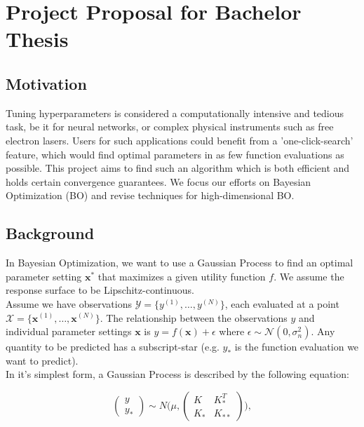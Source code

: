 \section{Project Proposal for Bachelor Thesis}
\subsection{Motivation}

Tuning hyperparameters is considered a computationally intensive and tedious task, be it for neural networks, or complex physical instruments such as free electron lasers.
Users for such applications could benefit from a 'one-click-search' feature, which would find optimal parameters in as few function evaluations as possible.
This project aims to find such an algorithm which is both efficient and holds certain convergence guarantees.
We focus our efforts on Bayesian Optimization (BO) and revise techniques for high-dimensional BO. \\

\subsection{Background}


In Bayesian Optimization, we want to use a Gaussian Process to find an optimal parameter setting $\mathbf{x^*}$ that maximizes a given utility function $f$.
We assume the response surface to be Lipschitz-continuous. \\

Assume we have observations $ \mathcal{Y} = \{ y^{(1)}, \ldots, y^{(N)} \}$, each evaluated at a point $ \mathcal{X} = \{  \mathbf{x}^{(1)}, \ldots, \mathbf{x}^{(N)} \}$.
The relationship between the observations $y$ and individual parameter settings $\mathbf{x}$ is $y = f \left( \mathbf{x} \right) + \epsilon$ where $\epsilon \sim  \mathcal{N} \left( 0, \sigma^2_n \right)$. Any quantity to be predicted has a subscript-star (e.g. $y_*$ is the function evaluation we want to predict).\\

In it's simplest form, a Gaussian Process is described by the following equation:

\begin{equation}
\begin{pmatrix} y \\
y_* \end{pmatrix} \sim N\Biggl(\mu,\begin{pmatrix} K & K^T_*\\
 K_* & K_{**} \end{pmatrix}\Biggr),
\end{equation}

